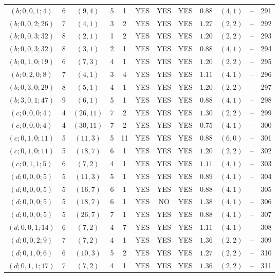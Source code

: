 \begin{longtable}{|c|c|c|c|c|c|c|c|c|c|c|c|}
$(b;0,0,1;4)$ & 6 & $(9,4)$ & 5 & 1 & YES & YES & YES & $0.88$ & $(4,1)$ & -- & 291\\
$(b;0,0,2;26)$ & 7 & $(4,1)$ & 3 & 2 & YES & YES & YES & $1.27$ & $(2,2)$ & -- & 292\\
$(b;0,0,3;32)$ & 8 & $(2,1)$ & 1 & 2 & YES & YES & YES & $1.20$ & $(2,2)$ & -- & 293\\
$(b;0,0,3;32)$ & 8 & $(3,1)$ & 2 & 1 & YES & YES & YES & $0.88$ & $(4,1)$ & -- & 294\\
$(b;0,1,0;19)$ & 6 & $(7,3)$ & 4 & 1 & YES & YES & YES & $1.20$ & $(2,2)$ & -- & 295\\
$(b;0,2,0;8)$ & 7 & $(4,1)$ & 3 & 4 & YES & YES & YES & $1.11$ & $(4,1)$ & -- & 296\\
$(b;0,3,0;29)$ & 8 & $(5,1)$ & 4 & 1 & YES & YES & YES & $1.20$ & $(2,2)$ & -- & 297\\
$(b;3,0,1;47)$ & 9 & $(6,1)$ & 5 & 1 & YES & YES & YES & $0.88$ & $(4,1)$ & -- & 298\\
$(c;0,0,0;4)$ & 4 & $(26,11)$ & 7 & 2 & YES & YES & YES & $1.30$ & $(2,2)$ & -- & 299\\
$(c;0,0,0;4)$ & 4 & $(30,11)$ & 7 & 2 & YES & YES & YES & $0.75$ & $(4,1)$ & -- & 300\\
$(c;0,1,0;11)$ & 5 & $(11,3)$ & 5 & 11 & YES & YES & YES & $0.88$ & $(6,0)$ & -- & 301\\
$(c;0,1,0;11)$ & 5 & $(18,7)$ & 6 & 1 & YES & YES & YES & $1.20$ & $(2,2)$ & -- & 302\\
$(c;0,1,1;5)$ & 6 & $(7,2)$ & 4 & 1 & YES & YES & YES & $1.11$ & $(4,1)$ & -- & 303\\
$(d;0,0,0;5)$ & 5 & $(11,3)$ & 5 & 1 & YES & YES & YES & $0.89$ & $(4,1)$ & -- & 304\\
$(d;0,0,0;5)$ & 5 & $(16,7)$ & 6 & 1 & YES & YES & YES & $0.88$ & $(4,1)$ & -- & 305\\
$(d;0,0,0;5)$ & 5 & $(18,7)$ & 6 & 1 & YES & NO & YES & $1.38$ & $(4,1)$ & -- & 306\\
$(d;0,0,0;5)$ & 5 & $(26,7)$ & 7 & 1 & YES & YES & YES & $0.88$ & $(4,1)$ & -- & 307\\
$(d;0,0,1;14)$ & 6 & $(7,2)$ & 4 & 7 & YES & YES & YES & $1.11$ & $(4,1)$ & -- & 308\\
$(d;0,0,2;9)$ & 7 & $(7,2)$ & 4 & 1 & YES & YES & YES & $1.36$ & $(2,2)$ & -- & 309\\
$(d;0,1,0;6)$ & 6 & $(10,3)$ & 5 & 2 & YES & YES & YES & $1.27$ & $(2,2)$ & -- & 310\\
$(d;0,1,1;17)$ & 7 & $(7,2)$ & 4 & 1 & YES & YES & YES & $1.36$ & $(2,2)$ & -- & 311\\

\end{longtable}
